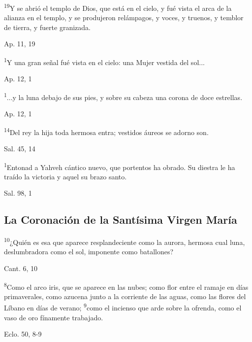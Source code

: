 \documentclass[a4paper,11pt]{article}
\begin{document}
      \textsuperscript{19}Y se abrió el templo de Dios, que está en el cielo, y fué vista el arca de la alianza en el templo,
      y se produjeron relámpagos, y voces, y truenos, y temblor de tierra, y fuerte granizada.
      \begin{flushright}
        Ap. 11, 19
      \end{flushright}

      \textsuperscript{1}Y una gran señal fué vista en el cielo: una Mujer vestida del sol...
      \begin{flushright}
        Ap. 12, 1
      \end{flushright}

      \textsuperscript{1}...y la luna debajo de sus pies, y sobre su cabeza una corona de doce estrellas.
      \begin{flushright}
        Ap. 12, 1
      \end{flushright}

      \textsuperscript{14}Del rey la hija toda hermosa entra; vestidos áureos se adorno son.
      \begin{flushright}
        Sal. 45, 14
      \end{flushright}

      \textsuperscript{1}Entonad a Yahveh cántico nuevo, que portentos ha obrado. Su diestra le ha traído la victoria y aquel su brazo santo.
      \begin{flushright}
        Sal. 98, 1
      \end{flushright}
    \subsection*{\hfil La Coronación de la Santísima Virgen María \hfil}

      \textsuperscript{10}¿Quién es esa que aparece resplandeciente como la aurora,
      hermosa cual luna, deslumbradora como el sol, imponente como batallones?
      \begin{flushright}
        Cant. 6, 10
      \end{flushright}

      \textsuperscript{8}Como el arco iris, que se aparece en las nubes; como flor entre el ramaje en días primaverales, como azucena junto
      a la corriente de las aguas, como las flores del Líbano en días de verano; \textsuperscript{9}como el incienso que arde sobre la ofrenda,
      como el vaso de oro fínamente trabajado.
      \begin{flushright}
        Eclo. 50, 8-9
      \end{flushright}
\end{document}

